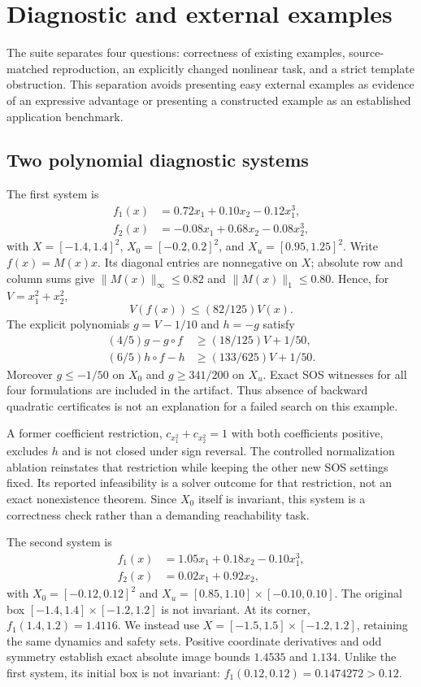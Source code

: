 \documentclass[5p,times]{elsarticle}
\theoremstyle{definition}\newtheorem{definition}[theorem]{Definition}
\theoremstyle{remark}\newtheorem{remark}[theorem]{Remark}
\begin{document}
\section{Diagnostic and external examples}\label{sec:experiments}
The suite separates four questions: correctness of existing examples, source-matched reproduction, an explicitly changed nonlinear task, and a strict template obstruction. This separation avoids presenting easy external examples as evidence of an expressive advantage or presenting a constructed example as an established application benchmark.

\subsection{Two polynomial diagnostic systems}
The first system is
\begin{align*}
 f_1(x)&=0.72x_1+0.10x_2-0.12x_1^3,\\
 f_2(x)&=-0.08x_1+0.68x_2-0.08x_2^3,
\end{align*}
with $X=[-1.4,1.4]^2$, $X_0=[-0.2,0.2]^2$, and $X_u=[0.95,1.25]^2$. Write $f(x)=M(x)x$. Its diagonal entries are nonnegative on $X$; absolute row and column sums give $\|M(x)\|_\infty\le0.82$ and $\|M(x)\|_1\le0.80$. Hence, for $V=x_1^2+x_2^2$,
\[
 V(f(x))\le(82/125)V(x).
\]
The explicit polynomials $g=V-1/10$ and $h=-g$ satisfy
\begin{align*}
 (4/5)g-g\circ f&\ge(18/125)V+1/50,\\
 (6/5)h\circ f-h&\ge(133/625)V+1/50.
\end{align*}
Moreover $g\le-1/50$ on $X_0$ and $g\ge341/200$ on $X_u$. Exact SOS witnesses for all four formulations are included in the artifact. Thus absence of backward quadratic certificates is not an explanation for a failed search on this example.

A former coefficient restriction, $c_{x_1^2}+c_{x_2^2}=1$ with both coefficients positive, excludes $h$ and is not closed under sign reversal. The controlled normalization ablation reinstates that restriction while keeping the other new SOS settings fixed. Its reported infeasibility is a solver outcome for that restriction, not an exact nonexistence theorem. Since $X_0$ itself is invariant, this system is a correctness check rather than a demanding reachability task.

The second system is
\begin{align*}
 f_1(x)&=1.05x_1+0.18x_2-0.10x_1^3,\\
 f_2(x)&=0.02x_1+0.92x_2,
\end{align*}
with $X_0=[-0.12,0.12]^2$ and $X_u=[0.85,1.10]\times[-0.10,0.10]$. The original box $[-1.4,1.4]\times[-1.2,1.2]$ is not invariant. At its corner, $f_1(1.4,1.2)=1.4116$. We instead use $X=[-1.5,1.5]\times[-1.2,1.2]$, retaining the same dynamics and safety sets. Positive coordinate derivatives and odd symmetry establish exact absolute image bounds $1.4535$ and $1.134$. Unlike the first system, its initial box is not invariant: $f_1(0.12,0.12)=0.1474272>0.12$.
\end{document}
